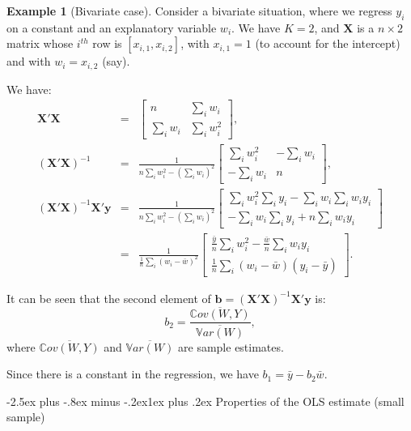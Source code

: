 \documentclass[
  11pt,
]{book}
\makeatletter
\renewcommand\subsection{\@startsection{subsection}{2}{\z@}
  {-2.5ex plus -.8ex minus -.2ex}{1ex plus .2ex}
  {\normalfont\large\bfseries\color{TextbookInk}}}
\theoremstyle{definition}
\theoremstyle{definition}
\newtheorem{example}{Example}[chapter]
\theoremstyle{definition}
\theoremstyle{definition}
\theoremstyle{remark}
\makeatother
\begin{document}
\begin{example}[Bivariate case]
\protect\hypertarget{exm:bivar}{}\label{exm:bivar}Consider a bivariate situation, where we regress \(y_i\) on a constant and an explanatory variable \(w_i\). We have \(K=2\), and \(\mathbf{X}\) is a \(n \times 2\) matrix whose \(i^{th}\) row is \([x_{i,1},x_{i,2}]\), with \(x_{i,1}=1\) (to account for the intercept) and with \(w_i = x_{i,2}\) (say).

We have:
\begin{eqnarray*}
\mathbf{X}'\mathbf{X} &=&
\left[\begin{array}{cc}
n & \sum_i w_i \\
\sum_i w_i & \sum_i w_i^2
\end{array}
\right],\\
(\mathbf{X}'\mathbf{X})^{-1} &=&
\frac{1}{n\sum_i w_i^2-(\sum_i w_i)^2}
\left[\begin{array}{cc}
\sum_i w_i^2 & -\sum_i w_i \\
-\sum_i w_i & n
\end{array}
\right],\\
(\mathbf{X}'\mathbf{X})^{-1}\mathbf{X}'\mathbf{y} &=&
\frac{1}{n\sum_i w_i^2-(\sum_i w_i)^2}
\left[\begin{array}{c}
\sum_i w_i^2\sum_i y_i -\sum_i w_i \sum_i w_iy_i \\
-\sum_i w_i \sum_i y_i + n \sum_i w_i y_i
\end{array}
\right]\\
&=& \frac{1}{\frac{1}{n}\sum_i(w_i - \bar{w})^2}
\left[\begin{array}{c}
\frac{\bar{y}}{n}\sum_i w_i^2 -\frac{\bar{w}}{n}\sum_i w_iy_i \\
\frac{1}{n}\sum_i (w_i-\bar{w})(y_i-\bar{y})
\end{array}
\right].
\end{eqnarray*}

It can be seen that the second element of \(\mathbf{b}=(\mathbf{X}'\mathbf{X})^{-1}\mathbf{X}'\mathbf{y}\) is:
\[
b_2 = \frac{\overline{\mathbb{C}ov(W,Y)}}{\overline{\mathbb{V}ar(W)}},
\]
where \(\overline{\mathbb{C}ov(W,Y)}\) and \(\overline{\mathbb{V}ar(W)}\) are sample estimates.

Since there is a constant in the regression, we have \(b_1 = \bar{y} - b_2 \bar{w}\).
\end{example}

\subsection{Properties of the OLS estimate (small sample)}\label{properties-of-the-ols-estimate-small-sample}
\end{document}
